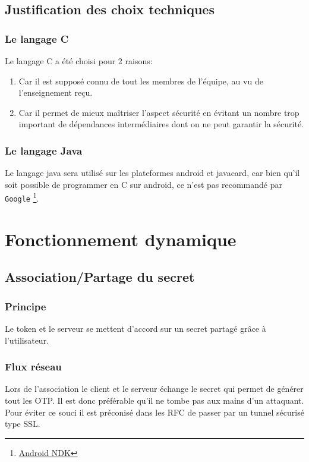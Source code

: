 \documentclass{"../../res/univ-projet"}
\begin{document}
\subsection{Justification des choix techniques}
\subsubsection{Le langage C}
Le langage C a été choisi pour 2 raisons:
\begin{enumerate}
    \item Car il est supposé connu de tout les membres de l'équipe, au vu
        de l'enseignement reçu.
    \item Car il permet de mieux maîtriser l'aspect sécurité en évitant un
        nombre trop important de dépendances intermédiaires dont on ne peut
        garantir la sécurité.
\end{enumerate}

\subsubsection{Le langage Java}
    Le langage java sera utilisé sur les plateformes android
    et javacard, car bien qu'il soit possible de programmer en C
    sur android, ce n'est pas recommandé par \verb?Google?
    \footnote{\href{https://developer.android.com/tools/sdk/ndk/index.html}{Android NDK}}.
        
\section{Fonctionnement dynamique}
\subsection{Association/Partage du secret}
\subsubsection{Principe}
Le token et le serveur se mettent d'accord sur un secret partagé gr\^ace à l'utilisateur.

\subsubsection{Flux réseau}
Lors de l'association le client et le serveur échange le secret qui permet
de générer tout les OTP. Il est donc préférable qu'il ne tombe pas aux mains
d'un attaquant. Pour éviter ce souci il est préconisé dans les RFC de passer
par un tunnel sécurisé type SSL.
\end{document}
